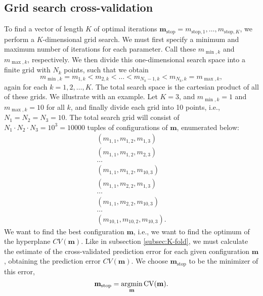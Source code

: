 \subsection{Grid search cross-validation}\label{grid-search}
To find a vector of length $K$ of optimal iterations $\mathbf{m}_{\text{stop}}=m_{\text{stop},1},\ldots,m_{\text{stop},K}$, we perform a $K$-dimensional grid search. We must first specify a minimum and maximum number of iterations for each parameter. Call these $m_{\min,k}$ and $m_{\max,k}$, respectively. We then divide this one-dimensional search space into a finite grid with $N_k$ points, such that we obtain
\begin{equation} 
    m_{\min,k}=m_{1,k}<m_{2,k}<\ldots<m_{N_k-1,k}<m_{N_k,k}=m_{\max,k},
\end{equation}
again for each $k=1,2,\ldots,K$. The total search space is the cartesian product of all of these grids. We illustrate with an example. Let $K=3$, and $m_{\min,k}=1$ and $m_{\max,k}=10$ for all $k$, and finally divide each grid into 10 points, i.e., $N_1=N_2=N_3=10$. The total search grid will consist of $N_1\cdot N_2\cdot N_3=10^3=10000$ tuples of configurations of $\mathbf{m}$, enumerated below:
\begin{align*}
    \left(m_{1,1},m_{1,2},m_{1,3}\right) \\
    \left(m_{1,1},m_{1,2},m_{2,3}\right) \\
    \ldots \\
    \left(m_{1,1},m_{1,2},m_{10,3}\right) \\
    \left(m_{1,1},m_{2,2},m_{1,3}\right) \\
    \ldots \\
    \left(m_{1,1},m_{2,2},m_{10,3}\right) \\
    \ldots \\
    \left(m_{10,1},m_{10,2},m_{10,3}\right).
\end{align*}
We want to find the best configuration $\mathbf{m}$, i.e., we want to find the optimum of the hyperplane $CV(\mathbf{m})$. Like in subsection \ref{subsec:K-fold}, we must calculate the estimate of the cross-validated prediction error for each given configuration $\mathbf{m}$, obtaining the prediction error $CV(\mathbf{m})$. We choose $\mathbf{m}_{\text{stop}}$ to be the minimizer of this error,
\begin{equation*}
    \mathbf{m}_{\text{stop}}=\operatorname*{argmin}_{\mathbf{m}}\operatorname{CV}(\mathbf{m}).
\end{equation*}
